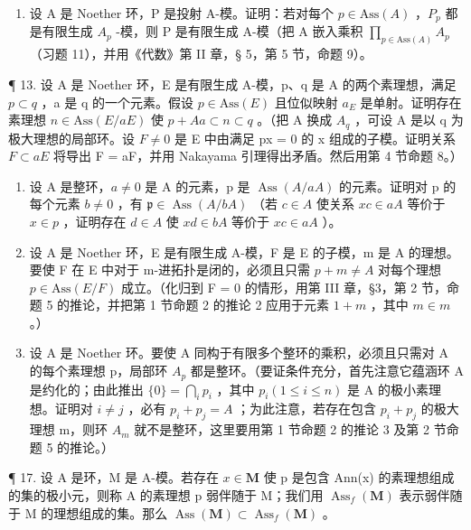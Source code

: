\begin{enumerate}
\def\labelenumi{\arabic{enumi}.}
\setcounter{enumi}{11}
\tightlist
\item
  设 A 是 Noether 环，P 是投射 A-模。证明：若对每个 \(p \in \text{Ass}(A)\) ，\(P_{p}\) 都是有限生成 \(A_{p}\) -模，则 P 是有限生成 A-模（把 A 嵌入乘积 \(\prod_{p \in \text{Ass}(A)} A_{p}\) （习题 11），并用《代数》第 II 章，§ 5，第 5 节，命题 9）。
\end{enumerate}

¶ 13. 设 A 是 Noether 环，E 是有限生成 A-模，p、q 是 A 的两个素理想，满足 \(p \subset q\) ，a 是 q 的一个元素。假设 \(p \in \text{Ass}(E)\) 且位似映射 \(a_{E}\) 是单射。证明存在素理想 \(n \in \text{Ass}(E/aE)\) 使 \(p + Aa \subset n \subset q\) 。（把 A 换成 \(A_{q}\) ，可设 A 是以 q 为极大理想的局部环。设 \(F \neq 0\) 是 E 中由满足 px = 0 的 x 组成的子模。证明关系 \(F \subset aE\) 将导出 F = aF，并用 Nakayama 引理得出矛盾。然后用第 4 节命题 8。）

\begin{enumerate}
\def\labelenumi{\arabic{enumi}.}
\setcounter{enumi}{13}
\item
  设 A 是整环，\(a \neq 0\) 是 A 的元素，p 是 \(\operatorname{Ass}(A/aA)\) 的元素。证明对 p 的每个元素 \(b \neq 0\) ，有 \(\mathfrak{p} \in \operatorname{Ass}(A/bA)\) （若 \(c \in A\) 使关系 \(xc \in aA\) 等价于 \(x \in p\) ，证明存在 \(d \in A\) 使 \(xd \in bA\) 等价于 \(xc \in aA\) ）。
\item
  设 A 是 Noether 环，E 是有限生成 A-模，F 是 E 的子模，m 是 A 的理想。要使 F 在 E 中对于 m-进拓扑是闭的，必须且只需 \(p + m \neq A\) 对每个理想 \(p \in \text{Ass}(E/F)\) 成立。（化归到 F = 0 的情形，用第 III 章，§3，第 2 节，命题 5 的推论，并把第 1 节命题 2 的推论 2 应用于元素 \(1 + m\) ，其中 \(m \in m\) 。）
\item
  设 A 是 Noether 环。要使 A 同构于有限多个整环的乘积，必须且只需对 A 的每个素理想 p，局部环 \(A_{p}\) 都是整环。（要证条件充分，首先注意它蕴涵环 A 是约化的；由此推出 \(\{0\} = \bigcap_{i} p_{i}\) ，其中 \(p_{i} (1 \leqslant i \leqslant n)\) 是 A 的极小素理想。证明对 \(i \neq j\) ，必有 \(p_{i} + p_{j} = A\) ；为此注意，若存在包含 \(p_{i} + p_{j}\) 的极大理想 m，则环 \(A_{m}\) 就不是整环，这里要用第 1 节命题 2 的推论 3 及第 2 节命题 5 的推论。）
\end{enumerate}

¶ 17. 设 A 是环，M 是 A-模。若存在 \(x \in \mathbf{M}\) 使 p 是包含 Ann(x) 的素理想组成的集的极小元，则称 A 的素理想 p 弱伴随于 M；我们用 \(\operatorname{Ass}_{f}(\mathbf{M})\) 表示弱伴随于 M 的理想组成的集。那么 \(\operatorname{Ass}(\mathbf{M}) \subset \operatorname{Ass}_{f}(\mathbf{M})\) 。

